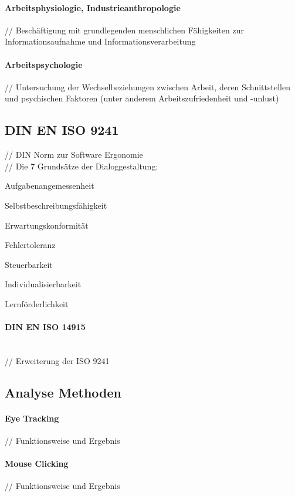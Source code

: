 \documentclass[12pt,a4paper,bibliography=totocnumbered,listof=totocnumbered]{scrartcl}
\begin{document}
\paragraph{Arbeitsphysiologie, Industrieanthropologie}
// Beschäftigung mit grundlegenden menschlichen Fähigkeiten zur Informationsaufnahme und Informationsverarbeitung\\

\paragraph{Arbeitspsychologie}
// Untersuchung der Wechselbeziehungen zwischen Arbeit, deren Schnittstellen und psychischen Faktoren (unter anderem Arbeitszufriedenheit und -unlust)\\

\subsection{DIN EN ISO 9241}
// DIN Norm zur Software Ergonomie\\
// Die 7 Grundsätze der Dialoggestaltung:
\begin{compactitem}
	\item Aufgabenangemessenheit
	\item Selbstbeschreibungsfähigkeit
	\item Erwartungskonformität
	\item Fehlertoleranz
	\item Steuerbarkeit
	\item Individualisierbarkeit
	\item Lernförderlichkeit
\end{compactitem}
\paragraph{DIN EN ISO 14915}
$\;$ \\
// Erweiterung der ISO 9241\\

\subsection{Analyse Methoden}
\paragraph{Eye Tracking}
// Funktionsweise und Ergebnis\\

\paragraph{Mouse Clicking}
// Funktionsweise und Ergebnis\\
\end{document}
